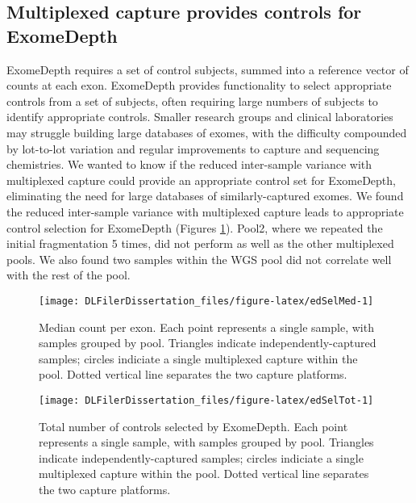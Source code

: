 \documentclass[11pt,letterpaper]{book}
\begin{document}
\hypertarget{multiplexed-capture-provides-controls-for-exomedepth}{%
\subsection{Multiplexed capture provides controls for ExomeDepth}\label{multiplexed-capture-provides-controls-for-exomedepth}}

ExomeDepth requires a set of control subjects, summed into a reference vector of counts at each exon.
ExomeDepth provides functionality to select appropriate controls from a set of subjects, often requiring large numbers of subjects to identify appropriate controls.
Smaller research groups and clinical laboratories may struggle building large databases of exomes, with the difficulty compounded by lot-to-lot variation and regular improvements to capture and sequencing chemistries.
We wanted to know if the reduced inter-sample variance with multiplexed capture could provide an appropriate control set for ExomeDepth, eliminating the need for large databases of similarly-captured exomes.
We found the reduced inter-sample variance with multiplexed capture leads to appropriate control selection for ExomeDepth (Figures \ref{fig:edSelMed}).
Pool2, where we repeated the initial fragmentation 5 times, did not perform as well as the other multiplexed pools.
We also found two samples within the WGS pool did not correlate well with the rest of the pool.





\begin{figure}

{\centering \texttt{[image: DLFilerDissertation\_files/figure-latex/edSelMed-1]} 

}

\caption[Median count per exon.]{Median count per exon. Each point represents a single sample, with samples grouped by pool. Triangles indicate independently-captured samples; circles indiciate a single multiplexed capture within the pool. Dotted vertical line separates the two capture platforms.}\label{fig:edSelMed}
\end{figure}



\begin{figure}

{\centering \texttt{[image: DLFilerDissertation\_files/figure-latex/edSelTot-1]} 

}

\caption[Total number of controls selected by ExomeDepth.]{Total number of controls selected by ExomeDepth. Each point represents a single sample, with samples grouped by pool. Triangles indicate independently-captured samples; circles indiciate a single multiplexed capture within the pool. Dotted vertical line separates the two capture platforms.}\label{fig:edSelTot}
\end{figure}
\end{document}
